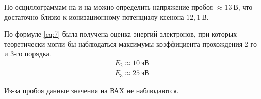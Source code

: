 \documentclass[a4paper, 12pt]{article}
\begin{document}
По осциллограммам на  и на  можно определить
напряжение пробоя $\approx 13\: \text{В}$, что достаточно близко к
ионизационному потенциалу ксенона $12,1\: \text{В}$.

По формуле \eqref{eq:7} была получена оценка энергий электронов, при
которых теоретически могли бы наблюдаться максимумы коэффициента
прохождения 2-го и 3-го порядка. 
\begin{equation*}
    \begin{gathered}
        E_2 \approx 10\: \text{эВ}\\
        E_3 \approx 25\: \text{эВ}
    \end{gathered}
\end{equation*}

Из-за пробоя данные значения на ВАХ не наблюдаются.
\end{document}

